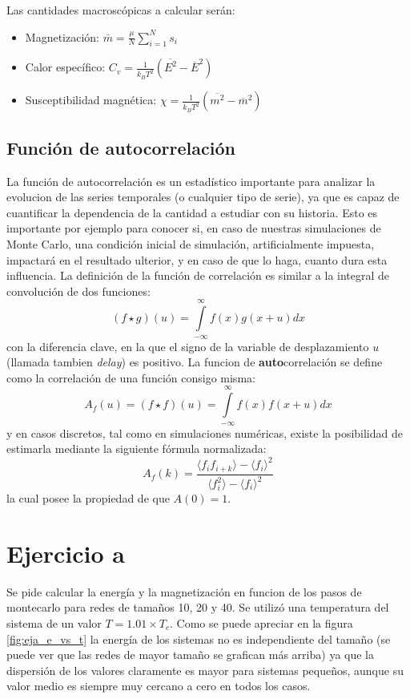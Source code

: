 \documentclass[a4paper,10pt]{paper}
\begin{document}
 Las cantidades macrosc\'opicas a calcular ser\'an:
 \begin{itemize}
  \item Magnetizaci\'on: $\bar{m} = \frac{\mu}{N} \sum\limits_{i=1}^{N} s_i$
  \item Calor espec\'ifico: $C_v = \frac{1}{k_B T^2}(\overline{E^2} -\overline{E}^2)$
  \item Susceptibilidad magn\'etica: $\chi = \frac{1}{k_B T^2}(\overline{m^2} -\overline{m}^2)$
 \end{itemize}

 \subsection{Funci\'on de autocorrelaci\'on}
 La funci\'on de autocorrelaci\'on es un estad\'istico importante para analizar la evolucion de las 
 series temporales (o cualquier tipo de serie), ya que es capaz de cuantificar la dependencia de la
 cantidad a estudiar con su historia. 
 Esto es importante por ejemplo para conocer si, en caso de nuestras simulaciones de Monte Carlo, una
 condici\'on inicial de simulaci\'on, artificialmente impuesta, impactar\'a en el resultado ulterior, 
 y en caso de que lo haga, cuanto dura esta influencia.
 La definici\'on de la funci\'on de correlaci\'on es similar a la integral de convoluci\'on de dos funciones:
\begin{displaymath} 
 (f \star g)(u) = \int\limits_{-\infty}^{\infty}f(x)g(x+u)dx
\end{displaymath}
 con la diferencia clave, en la que el signo de la variable de desplazamiento $u$ (llamada tambien \textit{delay})
 es positivo.
 La funcion de \textbf{auto}correlaci\'on se define como la correlaci\'on de una funci\'on consigo misma:
 \begin{displaymath} 
 A_f(u) = (f \star f)(u) = \int\limits_{-\infty}^{\infty}f(x)f(x+u)dx
\end{displaymath}
 y en casos discretos, tal como en simulaciones num\'ericas, existe la posibilidad de estimarla mediante la 
 siguiente f\'ormula normalizada:
 \begin{displaymath} 
 A_f(k) = \frac{\langle f_i f_{i+k} \rangle - \langle f_i\rangle^2}{\langle f_i^2 \rangle - \langle f_i\rangle^2}
\end{displaymath}
 la cual posee la propiedad de que $A(0)=1$. 
 \vspace{5cm}
 
\section{Ejercicio a}
Se pide calcular la energ\'ia y la magnetizaci\'on en funcion de los pasos de montecarlo para redes de tama\~nos
10, 20 y 40. Se utiliz\'o una temperatura del sistema de un valor $T = 1.01\times T_c$.
Como se puede apreciar en la figura \ref{fig:eja_e_vs_t} la energ\'ia de los sistemas no es independiente
del tama\~no (se puede ver que las redes de mayor tama\~no se grafican m\'as arriba) ya que la dispersi\'on de los valores
claramente es mayor para sistemas peque\~nos, aunque su valor medio es siempre muy cercano a cero en todos los casos.
\end{document}

